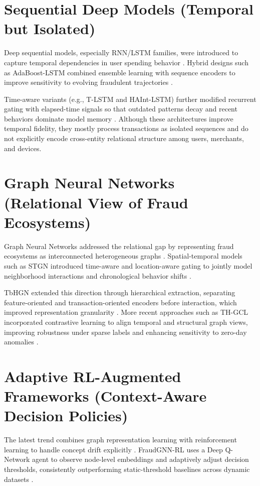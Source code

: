 \documentclass[12pt,a4paper]{report}
\begin{document}
\section{Sequential Deep Models (Temporal but Isolated)}
Deep sequential models, especially RNN/LSTM families, were introduced to capture temporal dependencies in user spending behavior \cite{rnn_fraud,lstm_fraud}. Hybrid designs such as AdaBoost-LSTM combined ensemble learning with sequence encoders to improve sensitivity to evolving fraudulent trajectories \cite{adaboost_lstm}.

Time-aware variants (e.g., T-LSTM and HAInt-LSTM) further modified recurrent gating with elapsed-time signals so that outdated patterns decay and recent behaviors dominate model memory \cite{t_lstm,haint_lstm}. Although these architectures improve temporal fidelity, they mostly process transactions as isolated sequences and do not explicitly encode cross-entity relational structure among users, merchants, and devices.

\section{Graph Neural Networks (Relational View of Fraud Ecosystems)}
Graph Neural Networks addressed the relational gap by representing fraud ecosystems as interconnected heterogeneous graphs \cite{gnn_fraud_hetero}. Spatial-temporal models such as STGN introduced time-aware and location-aware gating to jointly model neighborhood interactions and chronological behavior shifts \cite{stgn}.

TbHGN extended this direction through hierarchical extraction, separating feature-oriented and transaction-oriented encoders before interaction, which improved representation granularity \cite{tbhgn}. More recent approaches such as TH-GCL incorporated contrastive learning to align temporal and structural graph views, improving robustness under sparse labels and enhancing sensitivity to zero-day anomalies \cite{th_gcl}.

\section{Adaptive RL-Augmented Frameworks (Context-Aware Decision Policies)}
The latest trend combines graph representation learning with reinforcement learning to handle concept drift explicitly \cite{dqn}. FraudGNN-RL uses a Deep Q-Network agent to observe node-level embeddings and adaptively adjust decision thresholds, consistently outperforming static-threshold baselines across dynamic datasets \cite{fraudgnn_rl}.
\end{document}
